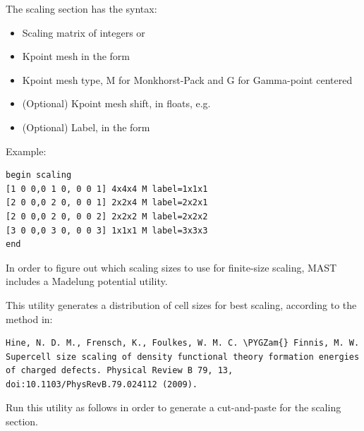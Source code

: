 \documentclass[letterpaper,10pt,english]{sphinxmanual}
\def\PYGZam{\char`\&}
\begin{document}
The scaling section has the syntax:
\begin{itemize}
\item {} 
Scaling matrix of integers \code{{[}M, N, P{]}} or \code{{[}M1 M2 M3, N1 N2 N3, P1 P2 P3{]}}

\item {} 
Kpoint mesh in the form 

\item {} 
Kpoint mesh type, M for Monkhorst-Pack and G for Gamma-point centered

\item {} 
(Optional) Kpoint mesh shift, in floats, e.g. 

\item {} 
(Optional) Label, in the form 

\end{itemize}

Example:

\begin{Verbatim}[commandchars=\\\{\}]
begin scaling
[1 0 0,0 1 0, 0 0 1] 4x4x4 M label=1x1x1
[2 0 0,0 2 0, 0 0 1] 2x2x4 M label=2x2x1
[2 0 0,0 2 0, 0 0 2] 2x2x2 M label=2x2x2
[3 0 0,0 3 0, 0 0 3] 1x1x1 M label=3x3x3
end
\end{Verbatim}

In order to figure out which scaling sizes to use for finite-size scaling, MAST includes a Madelung potential utility.

This utility generates a distribution of cell sizes for best scaling, according to the method in:

\begin{Verbatim}[commandchars=\\\{\}]
Hine, N. D. M., Frensch, K., Foulkes, W. M. C. \PYGZam{} Finnis, M. W. Supercell size scaling of density functional theory formation energies of charged defects. Physical Review B 79, 13, doi:10.1103/PhysRevB.79.024112 (2009).
\end{Verbatim}

Run this utility as follows in order to generate a cut-and-paste for the scaling section.
\end{document}
